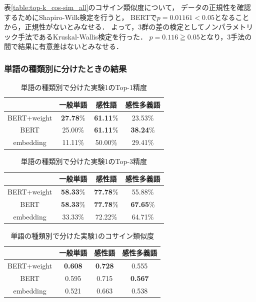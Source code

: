 			表\ref{table:top-k_cos-sim_all}のコサイン類似度について，
			データの正規性を確認するためにShapiro-Wilk検定を行うと，
			BERTで$p=0.01161<0.05$となることから，正規性がないとみなせる．
			よって，3群の差の検定としてノンパラメトリック手法であるKruskal-Wallis検定を行った．
			$p=0.116\geqq0.05$となり，3手法の間で結果に有意差はないとみなせる．
			
		\subsubsection{単語の種類別に分けたときの結果}
			\begin{table}[H]
				\centering
				\caption{単語の種類別で分けた実験1のTop-1精度}
				\label{table:top-1_hinshi}
					\begin{tabular}{cccc}
						\hline
						& 一般単語 & 感性語 & 感性多義語 \\
						\hline \hline
						BERT+weight & \textbf{27.78}\% & \textbf{61.11}\% & 23.53\% \\
						BERT & 25.00\% & \textbf{61.11}\% & \textbf{38.24}\% \\
						embedding & 11.11\% & 50.00\% & 29.41\% \\
						\hline
					\end{tabular}
			\end{table}

			\begin{table}[H]
				\centering
				\caption{単語の種類別で分けた実験1のTop-3精度}
				\label{table:top-3_hinshi}
					\begin{tabular}{cccc}
						\hline
						& 一般単語 & 感性語 & 感性多義語 \\
						\hline \hline
						BERT+weight & \textbf{58.33}\% & \textbf{77.78}\% & 55.88\% \\
						BERT & \textbf{58.33}\% & \textbf{77.78}\% & \textbf{67.65}\% \\
						embedding & 33.33\% & 72.22\% & 64.71\% \\
						\hline
					\end{tabular}
			\end{table}

			\begin{table}[H]
				\centering
				\caption{単語の種類別で分けた実験1のコサイン類似度}
				\label{table:cos_sim_hinshi}
					\begin{tabular}{cccc}
						\hline
						& 一般単語 & 感性語 & 感性多義語 \\
						\hline \hline
						BERT+weight & \textbf{0.608} & \textbf{0.728} & 0.555 \\
						BERT & 0.595 & 0.715 & \textbf{0.567} \\
						embedding & 0.521 & 0.663 & 0.538 \\
						\hline
					\end{tabular}
			\end{table}

